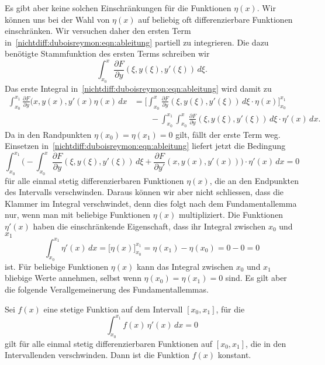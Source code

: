 Es gibt aber keine solchen Einschränkungen für die Funktionen $\eta(x)$.
Wir können uns bei der Wahl von $\eta(x)$ auf beliebig oft differenzierbare
Funktionen einschränken.
Wir versuchen daher den ersten Term
in~\eqref{nichtdiff:duboisreymon:eqn:ableitung}
partiell zu integrieren.
Die dazu benötigte Stammfunktion des ersten Terms schreiben wir
\[
\int_{x_0}^x \frac{\partial F}{\partial y}(\xi, y(\xi), y'(\xi))\,d\xi.
\]
Das erste Integral in~\eqref{nichtdiff:duboisreymon:eqn:ableitung}
wird damit zu
\begin{align*}
\int_{x_0}^{x_1}
\frac{\partial F}{\partial y}(x,y(x),y'(x)\eta(x)\,dx
&=
\biggl[
\int_{x_0}^{x}
\frac{\partial F}{\partial y}(\xi,y(\xi),y'(\xi))
\,d\xi
\cdot 
\eta(x)
\biggr]_{x_0}^{x_1}
\\
&\qquad
-
\int_{x_0}^{x_1}
\int_{x_0}^{x}
\frac{\partial F}{\partial y}(\xi,y(\xi),y'(\xi))
\,d\xi
\cdot\eta'(x)
\,dx.
\end{align*}
Da in den Randpunkten $\eta(x_0)=\eta(x_1)=0$ gilt, 
fällt der erste Term weg.
Einsetzen in~\eqref{nichtdiff:duboisreymon:eqn:ableitung}
liefert jetzt die Bedingung
\begin{equation}
\int_{x_0}^{x_1}
\biggl(
-\int_{x_0}^x\frac{\partial F}{\partial y}(\xi, y(\xi),y'(\xi))
\,d\xi
+
\frac{\partial F}{\partial y'}(x,y(x),y'(x))
\biggr)
\cdot
\eta'(x)\,dx
=
0
\label{buch:nichtdiff:duboisreymond:eqn:integralgleichung}
\end{equation}
für alle einmal stetig differenzierbaren Funktionen $\eta(x)$, die
an den Endpunkten des Intervalls verschwinden.
Daraus können wir aber nicht schliessen, dass die Klammer im
Integral verschwindet, denn dies folgt nach dem Fundamentallemma
nur, wenn man mit beliebige Funktionen $\eta(x)$ multipliziert.
Die Funktionen $\eta'(x)$ haben die einschränkende Eigenschaft,
dass ihr Integral zwischen $x_0$ und $x_1$
\[
\int_{x_0}^{x_1}
\eta'(x)\,dx
=
\biggl[
\eta(x)
\biggr]_{x_0}^{x_1}
=
\eta(x_1) - \eta(x_0)
=
0-0
=
0
\]
ist.
Für beliebige Funktionen $\eta(x)$ kann das Integral zwischen $x_0$
und $x_1$ bliebige Werte annehmen, selbst wenn $\eta(x_0)=\eta(x_1)=0$
sind.
Es gilt aber die folgende Verallgemeinerung des Fundamentallemmas.

\begin{lemma}
\label{buch:nichtdiff:duboisreymond:lemma:duboisreymond}
Sei $f(x)$ eine stetige Funktion auf dem Intervall $[x_0,x_1]$, für die
\[
\int_{x_0}^{x_1}
f(x)\,\eta'(x)\,dx
=
0
\]
gilt für alle einmal stetig differenzierbaren Funktionen auf $[x_0,x_1]$,
die in den Intervallenden verschwinden.
Dann ist die Funktion $f(x)$ konstant.
\end{lemma}

